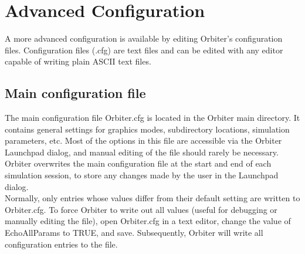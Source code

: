 \documentclass[Orbiter Developer Manual.tex]{subfiles}
\begin{document}
\section{Advanced Configuration}
A more advanced configuration is available by editing Orbiter's configuration files. Configuration files (.cfg) are text files and can be edited with any editor capable of writing plain ASCII text files.


\subsection{Main configuration file}
\label{ssec:main_cfg}
The main configuration file Orbiter.cfg is located in the Orbiter main directory. It contains general settings for graphics modes, subdirectory locations, simulation parameters, etc. Most of the options in this file are accessible via the Orbiter Launchpad dialog, and manual editing of the file should rarely be necessary.\\
Orbiter overwrites the main configuration file at the start and end of each simulation session, to store any changes made by the user in the Launchpad dialog.\\
Normally, only entries whose values differ from their default setting are written to Orbiter.cfg. To force Orbiter to write out all values (useful for debugging or manually editing the file), open Orbiter.cfg in a text editor, change the value of EchoAllParams to TRUE, and save. Subsequently, Orbiter will write all configuration entries to the file.
\end{document}

